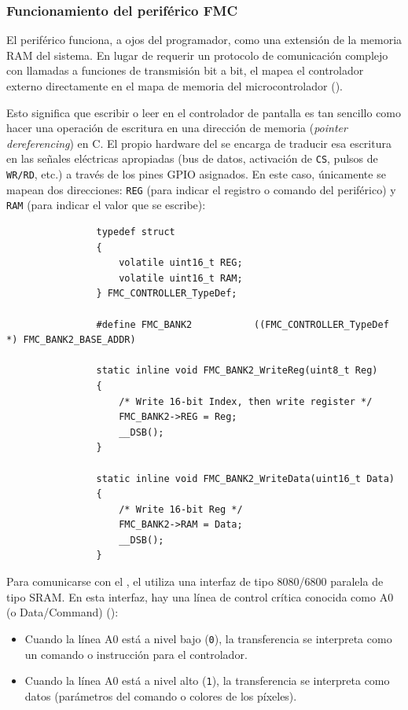 \documentclass[../main.tex]{subfiles}
\begin{document}
        \subsubsection{Funcionamiento del periférico FMC}

            El periférico  funciona, a ojos del programador, como una extensión de la memoria RAM del sistema. En lugar de requerir un protocolo de comunicación complejo con llamadas a funciones de transmisión bit a bit, el  mapea el controlador externo directamente en el mapa de memoria del microcontrolador (\REFMAN[12.4]).

            Esto significa que escribir o leer en el controlador de pantalla es tan sencillo como hacer una operación de escritura en una dirección de memoria (\emph{pointer dereferencing}) en C. El propio hardware del  se encarga de traducir esa escritura en las señales eléctricas apropiadas (bus de datos, activación de \texttt{CS}, pulsos de \texttt{WR/RD}, etc.) a través de los pines GPIO asignados. En este caso, únicamente se mapean dos direcciones: \texttt{REG} (para indicar el registro o comando del periférico) y \texttt{RAM} (para indicar el valor que se escribe):

            \begin{lstlisting}
                typedef struct
                {
                    volatile uint16_t REG;
                    volatile uint16_t RAM;
                } FMC_CONTROLLER_TypeDef;

                #define FMC_BANK2       	((FMC_CONTROLLER_TypeDef *) FMC_BANK2_BASE_ADDR)

                static inline void FMC_BANK2_WriteReg(uint8_t Reg)
                {
                    /* Write 16-bit Index, then write register */
                    FMC_BANK2->REG = Reg;
                    __DSB();
                }

                static inline void FMC_BANK2_WriteData(uint16_t Data)
                {
                    /* Write 16-bit Reg */
                    FMC_BANK2->RAM = Data;
                    __DSB();
                }
            \end{lstlisting}

            Para comunicarse con el \LCDMAN, el  utiliza una interfaz de tipo 8080/6800 paralela de tipo SRAM. En esta interfaz, hay una línea de control crítica conocida como A0 (o Data/Command) (\BRDMAN[Table 14]):
            \begin{itemize}
                \item Cuando la línea A0 está a nivel bajo (\texttt{0}), la transferencia se interpreta como un comando o instrucción para el controlador.
                \item Cuando la línea A0 está a nivel alto (\texttt{1}), la transferencia se interpreta como datos (parámetros del comando o colores de los píxeles).
            \end{itemize}
\end{document}
